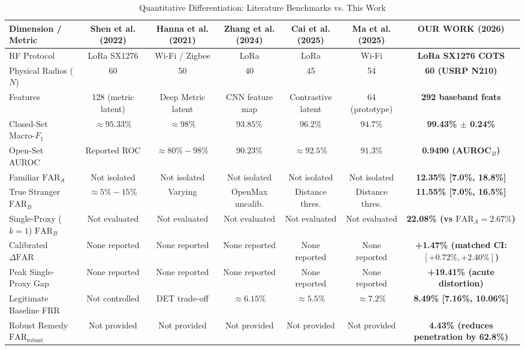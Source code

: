 \documentclass[conference]{IEEEtran}
\begin{document}
\begin{table}[t]
\centering
\caption{Quantitative Differentiation: Literature Benchmarks vs. This Work}
\label{tab:lit_comparison}
\small
\begin{tabular}{lcccccc}
\hline
\textbf{Dimension / Metric} & \textbf{Shen et al. (2022)} & \textbf{Hanna et al. (2021)} & \textbf{Zhang et al. (2024)} & \textbf{Cai et al. (2025)} & \textbf{Ma et al. (2025)} & \textbf{OUR WORK (2026)} \\
\hline
RF Protocol & LoRa SX1276 & Wi-Fi / Zigbee & LoRa & LoRa & Wi-Fi & \textbf{LoRa SX1276 COTS} \\
Physical Radios ($N$) & 60 & 50 & 40 & 45 & 54 & \textbf{60 (USRP N210)} \\
Features & 128 (metric latent) & Deep Metric latent & CNN feature map & Contrastive latent & 64 (prototype) & \textbf{292 baseband feats} \\
Closed-Set Macro-$F_1$ & $\approx 95.33\%$ & $\approx 98\%$ & $93.85\%$ & $96.2\%$ & $94.7\%$ & \textbf{99.43\% $\pm$ 0.24\%} \\
Open-Set AUROC & Reported ROC & $\approx 80\% - 98\%$ & $90.23\%$ & $\approx 92.5\%$ & $91.3\%$ & \textbf{0.9490 (AUROC$_B$)} \\
Familiar $\text{FAR}_A$ & Not isolated & Not isolated & Not isolated & Not isolated & Not isolated & \textbf{12.35\% [7.0\%, 18.8\%]} \\
True Stranger $\text{FAR}_B$ & $\approx 5\% - 15\%$ & Varying & OpenMax uncalib. & Distance thres. & Distance thres. & \textbf{11.55\% [7.0\%, 16.5\%]} \\
Single-Proxy ($k=1$) $\text{FAR}_B$ & Not evaluated & Not evaluated & Not evaluated & Not evaluated & Not evaluated & \textbf{22.08\% (vs $\text{FAR}_A = 2.67\%$)} \\
Calibrated $\Delta\text{FAR}$ & None reported & None reported & None reported & None reported & None reported & \textbf{+1.47\% (matched CI: $[+0.72\%, +2.40\%]$)} \\
Peak Single-Proxy Gap & None reported & None reported & None reported & None reported & None reported & \textbf{+19.41\% (acute distortion)} \\
Legitimate Baseline FRR & Not controlled & DET trade-off & $\approx 6.15\%$ & $\approx 5.5\%$ & $\approx 7.2\%$ & \textbf{8.49\% [7.16\%, 10.06\%]} \\
Robust Remedy $\text{FAR}_{\text{robust}}$ & Not provided & Not provided & Not provided & Not provided & Not provided & \textbf{4.43\% (reduces penetration by 62.8\%)} \\

\end{tabular}
\end{table}
\end{document}
